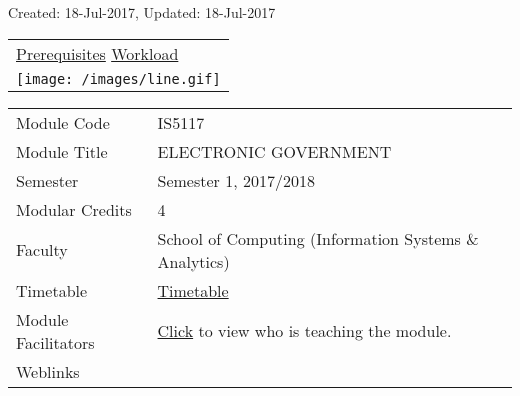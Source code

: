 \protect\hypertarget{ctl00_ctl00_ContentPlaceHolder1_ContentPlaceHolder1_LV_UpdateInfo_ctrl0_txtDate}{}{Created:
18-Jul-2017, Updated: 18-Jul-2017}

\begin{longtable}[]{@{}l@{}}
\toprule
\protect\hypertarget{ctl00_ctl00_ContentPlaceHolder1_ContentPlaceHolder1_lblSectionTop}{}{\protect\hyperlink{Prerequisites}{Prerequisites}
\textbar{} \protect\hyperlink{Workload}{Workload}}\tabularnewline
\texttt{[image: /images/line.gif]}\tabularnewline
\bottomrule
\end{longtable}

\hypertarget{ctl00_ctl00_ContentPlaceHolder1_ContentPlaceHolder1_LV_itemPlaceholderContainer}{}
\begin{longtable}[]{@{}ll@{}}
\toprule
\protect\hypertarget{ctl00_ctl00_ContentPlaceHolder1_ContentPlaceHolder1_LV_ctrl0_txtCode}{}{Module
Code} &
\protect\hypertarget{ctl00_ctl00_ContentPlaceHolder1_ContentPlaceHolder1_LV_ctrl0_lcCode}{}{IS5117}\tabularnewline
\protect\hypertarget{ctl00_ctl00_ContentPlaceHolder1_ContentPlaceHolder1_LV_ctrl0_lcCourse}{}{Module
Title} &
\protect\hypertarget{ctl00_ctl00_ContentPlaceHolder1_ContentPlaceHolder1_LV_ctrl0_lcCourseName}{}{ELECTRONIC
GOVERNMENT}\tabularnewline
\protect\hypertarget{ctl00_ctl00_ContentPlaceHolder1_ContentPlaceHolder1_LV_ctrl0_lcSemester}{}{Semester}
&
\protect\hypertarget{ctl00_ctl00_ContentPlaceHolder1_ContentPlaceHolder1_LV_ctrl0_lcSem}{}{Semester
1, 2017/2018}\tabularnewline
\protect\hypertarget{ctl00_ctl00_ContentPlaceHolder1_ContentPlaceHolder1_LV_ctrl0_lcModCredit}{}{Modular
Credits} &
\protect\hypertarget{ctl00_ctl00_ContentPlaceHolder1_ContentPlaceHolder1_LV_ctrl0_lcModC}{}{4}\tabularnewline
\protect\hypertarget{ctl00_ctl00_ContentPlaceHolder1_ContentPlaceHolder1_LV_ctrl0_lcFaculty}{}{Faculty}
&
\protect\hypertarget{ctl00_ctl00_ContentPlaceHolder1_ContentPlaceHolder1_LV_ctrl0_lcFac}{}{School
of Computing (Information Systems \& Analytics)}\tabularnewline
\protect\hypertarget{ctl00_ctl00_ContentPlaceHolder1_ContentPlaceHolder1_LV_ctrl0_Label1}{}{Timetable}
&
\protect\hypertarget{ctl00_ctl00_ContentPlaceHolder1_ContentPlaceHolder1_LV_ctrl0_Span1}{}{\href{javascript:void(0);}{Timetable}}\tabularnewline
\protect\hypertarget{ctl00_ctl00_ContentPlaceHolder1_ContentPlaceHolder1_LV_ctrl0_Label6}{}{Module
Facilitators} &
\protect\hypertarget{ctl00_ctl00_ContentPlaceHolder1_ContentPlaceHolder1_LV_ctrl0_Span2}{}{\href{list_lecturers.aspx?CourseID=c2566e96-8849-42a1-b6e8-36ec6e45867b\&ClickFrom=}{Click}
to view who is teaching the module.}\tabularnewline
\protect\hypertarget{ctl00_ctl00_ContentPlaceHolder1_ContentPlaceHolder1_LV_ctrl0_LabelCtrl1}{}{Weblinks}
&\tabularnewline
\bottomrule
\end{longtable}

